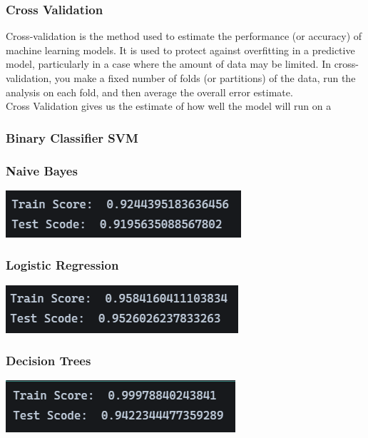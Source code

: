 \documentclass[11pt]{article}
\begin{document}
\subsubsection*{Cross Validation}
Cross-validation is the method used to estimate the performance (or accuracy) of machine learning models. It is used to protect against overfitting in a predictive model, particularly in a case where the amount of data may be limited. In cross-validation, you make a fixed number of folds (or partitions) of the data, run the analysis on each fold, and then average the overall error estimate.\\
Cross Validation gives us the estimate of how well the model will run on a 
\subsubsection*{Binary Classifier SVM}

\subsubsection*{Naive Bayes}
\begin{center}
	\includegraphics[scale=0.75]{figs/cv_NB.png}
\end{center}

\subsubsection*{Logistic Regression}
\begin{center}
	\includegraphics[scale=0.75]{figs/cv_LR.png}
\end{center}

\subsubsection*{Decision Trees}
\begin{center}
	\includegraphics[scale=0.75]{figs/cv_DT.png}
\end{center}
\end{document}
